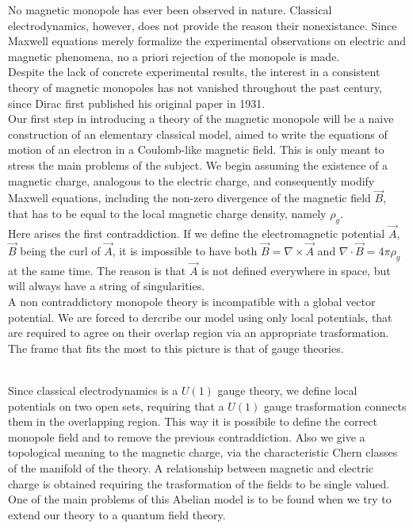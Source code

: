 


No magnetic monopole has ever been observed in nature. Classical electrodynamics,
however, does not provide the reason their nonexistance. Since Maxwell equations
merely formalize the experimental observations on electric and magnetic phenomena,
no a priori rejection of the monopole is made.\\
Despite the lack of concrete experimental results, the interest in a consistent
theory of magnetic monopoles has not vanished throughout the past century, since
Dirac first published his original paper in 1931.\\

Our first step in introducing a theory of the magnetic monopole will be a naive
construction of an elementary classical model, aimed to write the equations of motion
of an electron in a Coulomb-like magnetic field. This is only meant to stress the
main problems of the subject.
We begin assuming the existence of a magnetic charge, analogous to the electric
charge, and consequently modify Maxwell equations, including the non-zero
divergence of the magnetic field $\vec B$, that has to be equal to the local
magnetic charge density, namely $\rho_g$.\\
Here arises the first contraddiction. If we define the electromagnetic potential
$\vec A$, $\vec B$ being the curl of $\vec A$, it is impossible to have both
$\vec B = \nabla \times \vec A$ and $\nabla \cdot \vec B = 4\pi \rho_g$ at the same
time. The reason is that $\vec A$ is not defined everywhere in space, but will
always have a string of singularities.\\

A non contraddictory monopole theory is incompatible with a global vector potential.
We are forced to dercribe our model using only local potentials, that are required
to agree on their overlap region via an appropriate trasformation.\\
The frame that fits the most to this picture is that of gauge theories.\\\

Since classical electrodynamics is a $U(1)$ gauge theory, we define local potentials
on two open sets, requiring that a $U(1)$ gauge trasformation connects them in the
overlapping region. This way it is possibile to define the correct monopole field
and to remove the previous contraddiction. Also we give a topological meaning
to the magnetic charge, via the characteristic Chern classes of the manifold of
the theory. A relationship between magnetic and electric charge is obtained
requiring the trasformation of the fields to be single valued.\\
One of the main problems of this Abelian model is to be found when we try to
extend our theory to a quantum field theory.\\

